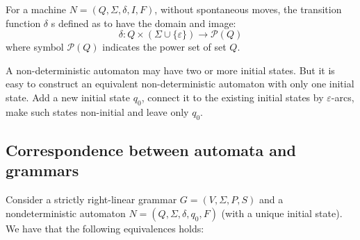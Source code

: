 For a machine $N=(Q,\Sigma,\delta,I,F)$, without spontaneous moves, the transition function $\delta$ s defined as to have the domain and image: 
\[\delta:Q\times\left(\Sigma\cup\{\varepsilon\}\right)\rightarrow \mathcal{P}(Q)\]
where symbol $\mathcal{P}(Q)$ indicates the power set of set $Q$. 

A non-deterministic automaton may have two or more initial states. 
But it is easy to construct an equivalent non-deterministic automaton with only one initial state. Add a new initial state $q_0$, connect it to the existing initial states by $\varepsilon$-arcs, make such states non-initial and leave only $q_0$. 

\subsection*{Correspondence between automata and grammars}
Consider a strictly right-linear grammar $G=(V,\Sigma,P,S)$ and a nondeterministic automaton $N=(Q,\Sigma,\delta,q_0,F)$ (with a unique initial state).
We have that the following equivalences holds: 

